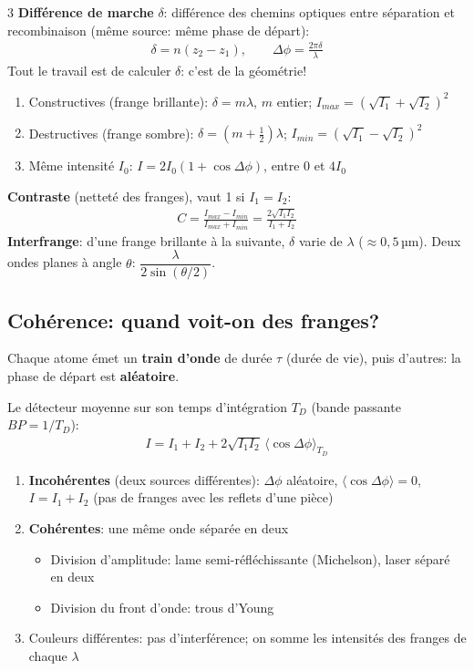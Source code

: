 \documentclass[12pt, a4paper]{article}
\begin{document}
\begin{multicols*}{3}
	\textbf{Différence de marche} $\delta$: différence des chemins optiques entre séparation et recombinaison (même source: même phase de départ):
	\begin{gather*}
		\delta=n(z_2-z_1),\qquad\Delta\phi=\frac{2\pi\delta}{\lambda}
	\end{gather*}
	Tout le travail est de calculer $\delta$: c'est de la géométrie!
	\begin{enumerate}[\roman*.]
		\item Constructives (frange brillante): $\delta=m\lambda$, $m$ entier; $I_{max}=(\sqrt{I_1}+\sqrt{I_2})^2$
		\item Destructives (frange sombre): $\delta=(m+\frac12)\lambda$; $I_{min}=(\sqrt{I_1}-\sqrt{I_2})^2$
		\item Même intensité $I_0$: $I=2I_0(1+\cos\Delta\phi)$, entre 0 et $4I_0$
	\end{enumerate}

	\colbreak
	\textbf{Contraste} (netteté des franges), vaut 1 si $I_1=I_2$:
	\begin{gather*}
		C=\frac{I_{max}-I_{min}}{I_{max}+I_{min}}=\frac{2\sqrt{I_1I_2}}{I_1+I_2}
	\end{gather*}
	\textbf{Interfrange}: d'une frange brillante à la suivante, $\delta$ varie de $\lambda$ ($\approx0{,}5$\,µm). Deux ondes planes à angle $\theta$: $\dfrac{\lambda}{2\sin(\theta/2)}$.

	\subsection{Cohérence: quand voit-on des franges?}
	Chaque atome émet un \textbf{train d'onde} de durée $\tau$ (durée de vie), puis d'autres: la phase de départ est \textbf{aléatoire}.

	Le détecteur moyenne sur son temps d'intégration $T_D$ (bande passante $BP=1/T_D$):
	\begin{gather*}
		I=I_1+I_2+2\sqrt{I_1I_2}\,\langle\cos\Delta\phi\rangle_{T_D}
	\end{gather*}
	\begin{enumerate}[\roman*.]
		\item \textbf{Incohérentes} (deux sources différentes): $\Delta\phi$ aléatoire, $\langle\cos\Delta\phi\rangle=0$, $I=I_1+I_2$ (pas de franges avec les reflets d'une pièce)
		\item \textbf{Cohérentes}: une même onde séparée en deux
		      \begin{itemize}
			      \item Division d'amplitude: lame semi-réfléchissante (Michelson), laser séparé en deux
			      \item Division du front d'onde: trous d'Young
		      \end{itemize}
		\item Couleurs différentes: pas d'interférence; on somme les intensités des franges de chaque $\lambda$
	\end{enumerate}


\end{multicols*}
\end{document}
